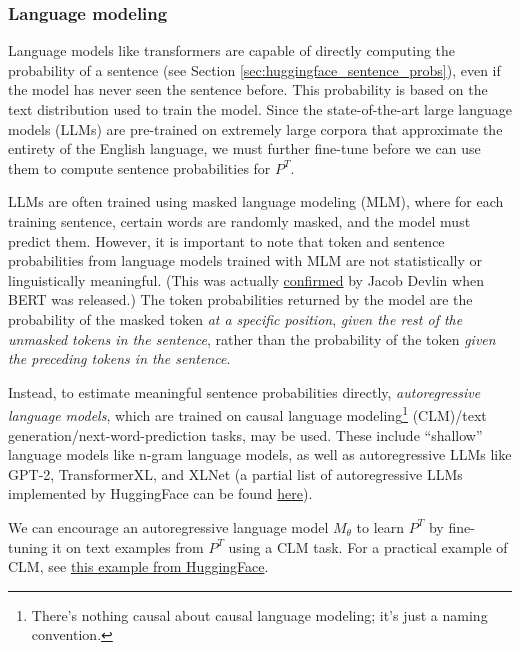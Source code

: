 \documentclass{article}
\begin{document}
\subsubsection{Language modeling}
\label{sec:language_modeling}

Language models like transformers are capable of directly computing the probability of a sentence (see Section \ref{sec:huggingface_sentence_probs}), even if the model has never seen the sentence before. This probability is based on the text distribution used to train the model. Since the state-of-the-art large language models (LLMs) are pre-trained on extremely large corpora that approximate the entirety of the English language, we must further fine-tune before we can use them to compute sentence probabilities for $P^T$.

LLMs are often trained using masked language modeling (MLM), where for each training sentence, certain words are randomly masked, and the model must predict them. However, it is important to note that token and sentence probabilities from language models trained with MLM are not statistically or linguistically meaningful. (This was actually \href{https://github.com/google-research/bert/issues/35}{confirmed} by Jacob Devlin when BERT was released.) The token probabilities returned by the model are the probability of the masked token \textit{at a specific position}, \textit{given the rest of the unmasked tokens in the sentence}, rather than the probability of the token \textit{given the preceding tokens in the sentence}. 

Instead, to estimate meaningful sentence probabilities directly, \textit{autoregressive language models}, which are trained on causal language modeling\footnote{There's nothing causal about causal language modeling; it's just a naming convention.} (CLM)/text generation/next-word-prediction tasks, may be used. These include ``shallow'' language models like n-gram language models, as well as autoregressive LLMs like GPT-2, TransformerXL, and XLNet (a partial list of autoregressive LLMs implemented by HuggingFace can be found \href{https://web.archive.org/web/20230125132319/https://huggingface.co/docs/transformers/model_summary#autoregressive-models}{here}).

We can encourage an autoregressive language model $M_\theta$ to learn $P^T$ by fine-tuning it on text examples from $P^T$ using a CLM task. For a practical example of CLM, see \href{https://huggingface.co/docs/transformers/tasks/language_modeling}{this example from HuggingFace}.
\end{document}
